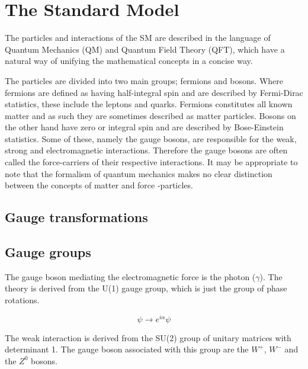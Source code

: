 \section{The Standard Model}
The particles and interactions of the SM are described in the language of Quantum Mechanics (QM) and Quantum Field Theory (QFT), which have a natural way of unifying the mathematical concepts in a concise way.

The particles are divided into two main groups; fermions and bosons. Where fermions are defined as having half-integral spin and are described by Fermi-Dirac statistics, these include the leptons and quarks. Fermions constitutes all known matter and as such they are sometimes described as matter particles. Bosons on the other hand have zero or integral spin and are described by Bose-Einstein statistics. Some of these, namely the gauge bosons, are responsible for the weak, strong and electromagnetic interactions. Therefore the gauge bosons are often called the force-carriers of their respective interactions. It may be appropriate to note that the formalism of quantum mechanics makes no clear distinction between the concepts of matter and force -particles.


\subsection{Gauge transformations}

\subsection{Gauge groups}
The gauge boson mediating the electromagnetic force is the photon ($\gamma$). The theory is derived from the U(1) gauge group, which is just the group of phase rotations.

\begin{equation}
    \psi \rightarrow e^{i\alpha} \psi
\end{equation}

The weak interaction is derived from the SU(2) group of unitary matrices with determinant 1. The gauge boson associated with this group are the $W^+$, $W^-$ and the $Z^0$ bosons.

